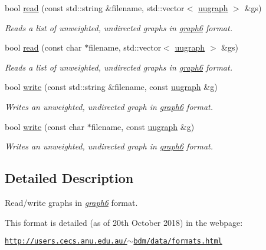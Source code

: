 \begin{DoxyCompactItemize}
bool \hyperlink{namespacelgraph_1_1io_1_1graph6_ad36631b2e69f1a58d9678ee01a335739}{read} (const std\+::string \&filename, std\+::vector$<$ \hyperlink{classlgraph_1_1uugraph}{uugraph} $>$ \&gs)
\begin{DoxyCompactList}\small\item\em Reads a list of unweighted, undirected graphs in {\itshape \hyperlink{namespacelgraph_1_1io_1_1graph6}{graph6}} format. \end{DoxyCompactList}\item 
bool \hyperlink{namespacelgraph_1_1io_1_1graph6_a90d5dd8ee748263b93cdb4513a36cbf5}{read} (const char $\ast$filename, std\+::vector$<$ \hyperlink{classlgraph_1_1uugraph}{uugraph} $>$ \&gs)
\begin{DoxyCompactList}\small\item\em Reads a list of unweighted, undirected graphs in {\itshape \hyperlink{namespacelgraph_1_1io_1_1graph6}{graph6}} format. \end{DoxyCompactList}\item 
bool \hyperlink{namespacelgraph_1_1io_1_1graph6_ad011c538d80f9dafb02b1504b9c07e44}{write} (const std\+::string \&filename, const \hyperlink{classlgraph_1_1uugraph}{uugraph} \&g)
\begin{DoxyCompactList}\small\item\em Writes an unweighted, undirected graph in {\itshape \hyperlink{namespacelgraph_1_1io_1_1graph6}{graph6}} format. \end{DoxyCompactList}\item 
bool \hyperlink{namespacelgraph_1_1io_1_1graph6_a5e2bba91e66667d06c699fbf7c6c634c}{write} (const char $\ast$filename, const \hyperlink{classlgraph_1_1uugraph}{uugraph} \&g)
\begin{DoxyCompactList}\small\item\em Writes an unweighted, undirected graph in {\itshape \hyperlink{namespacelgraph_1_1io_1_1graph6}{graph6}} format. \end{DoxyCompactList}\end{DoxyCompactItemize}


\subsection{Detailed Description}
Read/write graphs in {\itshape \hyperlink{namespacelgraph_1_1io_1_1graph6}{graph6}} format. 

This format is detailed (as of 20th October 2018) in the webpage\+:

\href{http://users.cecs.anu.edu.au/~bdm/data/formats.html}{\tt http\+://users.\+cecs.\+anu.\+edu.\+au/$\sim$bdm/data/formats.\+html}

